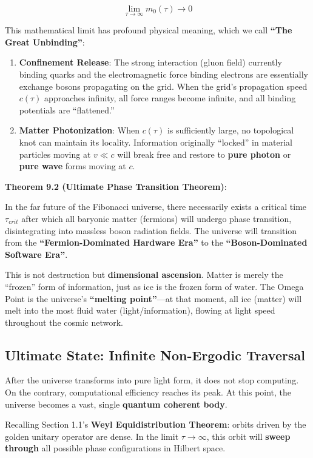 \[\lim_{\tau \to \infty} m_0(\tau) \to 0\]

This mathematical limit has profound physical meaning, which we call \textbf{``The Great Unbinding''}:

\begin{enumerate}
\item \textbf{Confinement Release}: The strong interaction (gluon field) currently binding quarks and the electromagnetic force binding electrons are essentially exchange bosons propagating on the grid. When the grid's propagation speed $c(\tau)$ approaches infinity, all force ranges become infinite, and all binding potentials are ``flattened.''
\item \textbf{Matter Photonization}: When $c(\tau)$ is sufficiently large, no topological knot can maintain its locality. Information originally ``locked'' in material particles moving at $v \ll c$ will break free and restore to \textbf{pure photon} or \textbf{pure wave} forms moving at $c$.
\end{enumerate}

\textbf{Theorem 9.2 (Ultimate Phase Transition Theorem)}:

In the far future of the Fibonacci universe, there necessarily exists a critical time $\tau_{crit}$ after which all baryonic matter (fermions) will undergo phase transition, disintegrating into massless boson radiation fields. The universe will transition from the \textbf{``Fermion-Dominated Hardware Era''} to the \textbf{``Boson-Dominated Software Era''}.

This is not destruction but \textbf{dimensional ascension}. Matter is merely the ``frozen'' form of information, just as ice is the frozen form of water. The Omega Point is the universe's \textbf{``melting point''}---at that moment, all ice (matter) will melt into the most fluid water (light/information), flowing at light speed throughout the cosmic network.

\subsection{Ultimate State: Infinite Non-Ergodic Traversal}

After the universe transforms into pure light form, it does not stop computing. On the contrary, computational efficiency reaches its peak.
At this point, the universe becomes a vast, single \textbf{quantum coherent body}.

Recalling Section 1.1's \textbf{Weyl Equidistribution Theorem}: orbits driven by the golden unitary operator are dense.
In the limit $\tau \to \infty$, this orbit will \textbf{sweep through} all possible phase configurations in Hilbert space.

